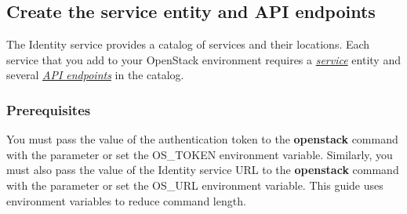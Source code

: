 \documentclass[letterpaper,10pt,english]{sphinxmanual}
\begin{document}
\subsection{Create the service entity and API endpoints}
\label{_source/installation_guide/keystone-services:create-the-service-entity-and-api-endpoints}\label{_source/installation_guide/keystone-services::doc}
The Identity service provides a catalog of services and their locations.
Each service that you add to your OpenStack environment requires a
{\hyperref[_source/glossary:term-service]{\emph{service}}} entity and several {\hyperref[_source/glossary:term-api-endpoint]{\emph{API endpoints}}}
in the catalog.


\subsubsection{Prerequisites}
\label{_source/installation_guide/keystone-services:prerequisites}
You must pass the value of the authentication token to the \textbf{openstack}
command with the  parameter or set the OS\_TOKEN
environment variable. Similarly, you must also pass the value of the
Identity service URL to the \textbf{openstack} command with the 
parameter or set the OS\_URL environment variable. This guide uses
environment variables to reduce command length.
\end{document}
